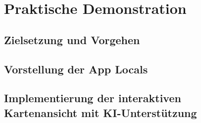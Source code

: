\chapter{Praktische Demonstration}

\section{Zielsetzung und Vorgehen}


\section{Vorstellung der App \glqq Locals\grqq}


\section{Implementierung der interaktiven Kartenansicht mit KI-Unterstützung}


% 

% 
